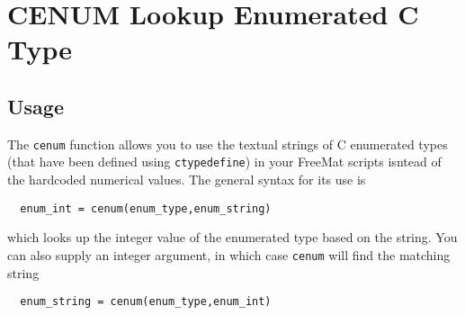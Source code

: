 \section{CENUM Lookup Enumerated C Type}

\subsection{Usage}

The \verb|cenum| function allows you to use the textual strings of C 
enumerated types (that have been defined using \verb|ctypedefine|) in
your FreeMat scripts isntead of the hardcoded numerical values.  The
general syntax for its use is
\begin{verbatim}
  enum_int = cenum(enum_type,enum_string)
\end{verbatim}
which looks up the integer value of the enumerated type based on the
string.  You can also supply an integer argument, in which case
\verb|cenum| will find the matching string
\begin{verbatim}
  enum_string = cenum(enum_type,enum_int)
\end{verbatim}
